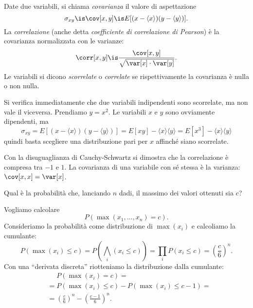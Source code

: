 
\begin{definition}[Covarianza]
	Date due variabili, si chiama \emph{covarianza} il valore di aspettazione
	\begin{equation*}
		\sigma_{xy} \is \cov[x,y] \is E[(x-\langle x\rangle)(y-\langle y\rangle)].
	\end{equation*}
	La \emph{correlazione} (anche detta \emph{coefficiente di correlazione di
    Pearson}) è la covarianza normalizzata con le varianze:
	\begin{equation*}
		\corr[x,y] \is \frac{\cov[x,y]}{\sqrt{\var[x]\cdot\var[y]}}.
	\end{equation*}
	Le variabili si dicono \emph{scorrelate} o \emph{correlate} se rispettivamente la covarianza è nulla o non nulla.
\end{definition}

Si verifica immediatamente che due variabili indipendenti sono scorrelate, ma non vale il viceversa.
Prendiamo $y=x^2$. Le variabili $x$ e $y$ sono ovviamente dipendenti, ma
\begin{equation*}
	\sigma_{xy} = E[(x-\langle x\rangle)(y-\langle y\rangle)] = E[xy] - \langle x\rangle\langle y\rangle = E[x^3] - \langle x\rangle\langle y\rangle
\end{equation*}
quindi basta scegliere una distribuzione pari per $x$ affinché siano scorrelate.

Con la disuguaglianza di Cauchy-Schwartz si dimostra che la correlazione è compresa tra $-1$ e $1$.
La covarianza di una variabile con sé stessa è la varianza: $\cov[x,x]=\var[x]$.

\begin{exercise}
	Qual è la probabilità che, lanciando $n$ dadi, il massimo dei valori ottenuti sia $c$?
\end{exercise}

\begin{solution*}
	Vogliamo calcolare
	\begin{equation*}
		P(\max(x_1,\dots,x_n) = c).
	\end{equation*}
	Consideriamo la probabilità come distribuzione di $\max(x_i)$ e calcoliamo la cumulante:
	\begin{equation*}
		P(\max(x_i) \le c) = P\left(\bigwedge_i(x_i \le c)\right) = \prod_i P(x_i \le c) = \left (\frac c6 \right)^n.
	\end{equation*}
	Con una ``derivata discreta'' riotteniamo la distribuzione dalla cumulante:
	\begin{align*}
		&\phantom{{}={}} P(\max(x_i) = c) = \\
		&= P(\max(x_i) \le c) - P(\max(x_i) \le c-1) = \\
		&= \left (\frac c6 \right)^n - \left (\frac {c-1}6 \right)^n.
	\end{align*}
\end{solution*}

